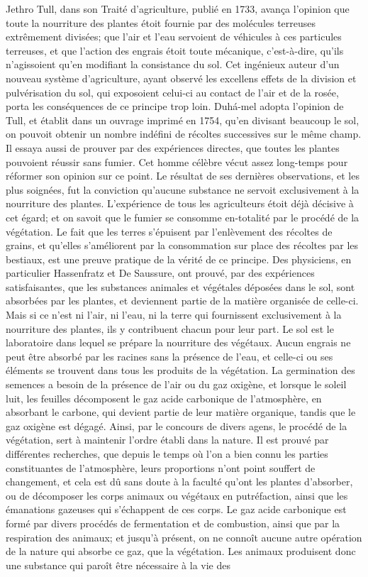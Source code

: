 Jethro Tull, dans son Traité d'agriculture,\setcounter{page}{341} publié en 1733, avança l'opinion que toute la nourriture des plantes étoit fournie par des molécules terreuses extrêmement divisées; que l'air et l'eau servoient de véhicules à ces particules terreuses, et que l'action des engrais étoit toute mécanique, c'est-à-dire, qu'ils n'agissoient qu'en modifiant la consistance du sol. Cet ingénieux auteur d'un nouveau système d'agriculture, ayant observé les excellens effets de la division et pulvérisation du sol, qui exposoient celui-ci au contact de l'air et de la rosée, porta les conséquences de ce principe trop loin. Duhá-mel adopta l'opinion de Tull, et établit dans un ouvrage imprimé en 1754, qu'en divisant beaucoup le sol, on pouvoit obtenir un nombre indéfini de récoltes successives sur le même champ. Il essaya aussi de prouver par des expériences directes, que toutes les plantes pouvoient réussir sans fumier. Cet homme célèbre vécut assez long-temps pour réformer son opinion sur ce point. Le résultat de ses dernières observations, et les plus soignées, fut la conviction qu'aucune substance ne servoit exclusivement à la nourriture des plantes. L'expérience de tous les agriculteurs étoit déjà décisive à cet égard; et on savoit que le fumier se consomme en-totalité par le procédé de la végétation. Le\setcounter{page}{342} fait que les terres s'épuisent par l'enlèvement des récoltes de grains, et qu'elles s'améliorent par la consommation sur place des récoltes par les bestiaux, est une preuve pratique de la vérité de ce principe. Des physiciens, en particulier Hassenfratz et De Saussure, ont prouvé, par des expériences satisfaisantes, que les substances animales et végétales déposées dans le sol, sont absorbées par les plantes, et deviennent partie de la matière organisée de celle-ci. Mais si ce n'est ni l'air, ni l'eau, ni la terre qui fournissent exclusivement à la nourriture des plantes, ils y contribuent chacun pour leur part. Le sol est le laboratoire dans lequel se prépare la nourriture des végétaux. Aucun engrais ne peut être absorbé par les racines sans la présence de l'eau, et celle-ci ou ses éléments se trouvent dans tous les produits de la végétation. La germination des semences a besoin de la présence de l'air ou du gaz oxigène, et lorsque le soleil luit, les feuilles décomposent le gaz acide carbonique de l'atmosphère, en absorbant le carbone, qui devient partie de leur matière organique, tandis que le gaz oxigène est dégagé. Ainsi, par le concours de divers agens, le procédé de la végétation, sert à maintenir l'ordre établi dans la nature.\setcounter{page}{343} Il est prouvé par différentes recherches, que depuis le temps où l'on a bien connu les parties constituantes de l'atmosphère, leurs proportions n'ont point souffert de changement, et cela est dû sans doute à la faculté qu'ont les plantes d'absorber, ou de décomposer les corps animaux ou végétaux en putréfaction, ainsi que les émanations gazeuses qui s'échappent de ces corps. Le gaz acide carbonique est formé par divers procédés de fermentation et de combustion, ainsi que par la respiration des animaux; et jusqu'à présent, on ne connoît aucune autre opération de la nature qui absorbe ce gaz, que la végétation. Les animaux produisent donc une substance qui paroît être nécessaire à la vie des 